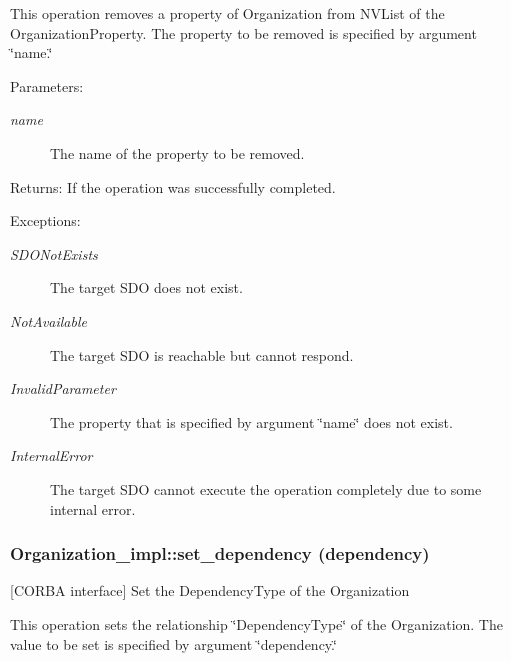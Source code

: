 This operation removes a property of Organization from NVList of the Organization\-Property. The property to be removed is specified by argument \char`\"{}name.\char`\"{}

\begin{Desc}
\item[Parameters:]
\begin{description}
\item[{\em name}]The name of the property to be removed. \end{description}
\end{Desc}
\begin{Desc}
\item[Returns:]If the operation was successfully completed. \end{Desc}
\begin{Desc}
\item[Exceptions:]
\begin{description}
\item[{\em SDONot\-Exists}]The target SDO does not exist. \item[{\em Not\-Available}]The target SDO is reachable but cannot respond. \item[{\em Invalid\-Parameter}]The property that is specified by argument \char`\"{}name\char`\"{} does not exist. \item[{\em Internal\-Error}]The target SDO cannot execute the operation completely due to some internal error.\end{description}
\end{Desc}
\subsubsection{\setlength{\rightskip}{0pt plus 5cm}Organization\_\-impl::set\_\-dependency (dependency)}\label{classOrganization__impl_Organization__impla13}


[CORBA interface] Set the Dependency\-Type of the Organization 

This operation sets the relationship \char`\"{}Dependency\-Type\char`\"{} of the Organization. The value to be set is specified by argument \char`\"{}dependency.\char`\"{}

